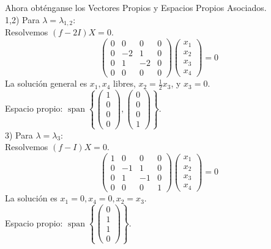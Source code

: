 \begin{solution}
Ahora obténganse los Vectores Propios y Espacios Propios Asociados. \\
1,2)   Para $\lambda=\lambda_{1,2}$: \\
Resolvemos \((f - 2I)X = 0\).
\[
     \begin{pmatrix}
     0 & 0 & 0 & 0 \\
     0 & -2 & 1 & 0 \\
     0 & 1 & -2 & 0 \\
     0 & 0 & 0 & 0
     \end{pmatrix}
     \begin{pmatrix}
     x_1 \\
     x_2 \\
     x_3 \\
     x_4
     \end{pmatrix}
     = 0
     \]
La solución general es \( x_1, x_4 \) libres, \( x_2 = \frac{1}{2}x_3 \), y \( x_3 = 0 \). \\
Espacio propio: \(\operatorname{span}\left\{\begin{pmatrix} 1 \\ 0 \\ 0 \\ 0 \end{pmatrix}, \begin{pmatrix} 0 \\ 0 \\ 0 \\ 1 \end{pmatrix}\right\}\). \\

3)   Para $\lambda=\lambda_{3}$: \\
Resolvemos \((f - I)X = 0\).
\[
     \begin{pmatrix}
     1 & 0 & 0 & 0 \\
     0 & -1 & 1 & 0 \\
     0 & 1 & -1 & 0 \\
     0 & 0 & 0 & 1
     \end{pmatrix}
     \begin{pmatrix}
     x_1 \\
     x_2 \\
     x_3 \\
     x_4
     \end{pmatrix}
     = 0
     \]
La solución es \( x_1 = 0, x_4 = 0, x_2 = x_3 \). \\
Espacio propio: \(\operatorname{span}\left\{\begin{pmatrix} 0 \\ 1 \\ 1 \\ 0 \end{pmatrix}\right\}\). \\


\end{solution}
